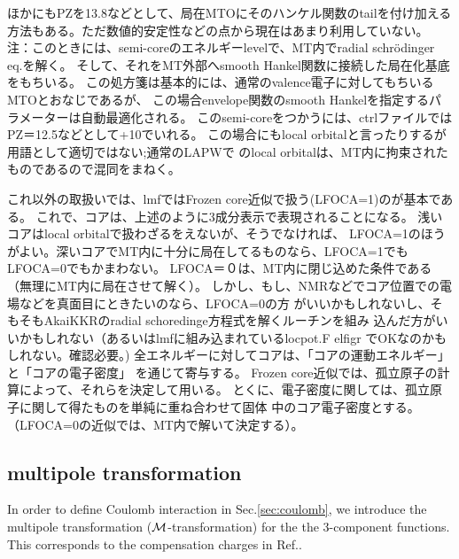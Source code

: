 \documentclass[a4paper,10pt,aip,onecolumn,amsmath,amssymb,floatfix,rmp]{revtex4-1}
\def\MM{{\cal M}}
\begin{document}
{\small 
ほかにもPZを13.8などとして、局在MTOにそのハンケル関数のtailを付け加える
方法もある。ただ数値的安定性などの点から現在はあまり利用していない。
注：このときには、semi-coreのエネルギーlevelで、MT内でradial schr\"odinger eq.を解く。
そして、それをMT外部へsmooth Hankel関数に接続した局在化基底をもちいる。
この処方箋は基本的には、通常のvalence電子に対してもちいるMTOとおなじであるが、
この場合envelope関数のsmooth Hankelを指定するパラメーターは自動最適化される。
このsemi-coreをつかうには、ctrlファイルではPZ＝12.5などとして+10でいれる。
この場合にもlocal orbitalと言ったりするが用語として適切ではない;通常のLAPWで
のlocal orbitalは、MT内に拘束されたものであるので混同をまねく。
}

これ以外の取扱いでは、lmfではFrozen core近似で扱う(LFOCA=1)のが基本である。
これで、コアは、上述のように3成分表示で表現されることになる。
浅いコアはlocal orbitalで扱わざるをえないが、そうでなければ、
LFOCA=1のほうがよい。深いコアでMT内に十分に局在してるものなら、LFOCA=1でもLFOCA=0でもかまわない。
LFOCA＝０は、MT内に閉じ込めた条件である（無理にMT内に局在させて解く）。
しかし、もし、NMRなどでコア位置での電場などを真面目にときたいのなら、LFOCA=0の方
がいいかもしれないし、そもそもAkaiKKRのradial schoredinge方程式を解くルーチンを組み
込んだ方がいいかもしれない（あるいはlmfに組み込まれているlocpot.F elfigr
でOKなのかもしれない。確認必要。)
全エネルギーに対してコアは、「コアの運動エネルギー」と「コアの電子密度」
を通じて寄与する。
Frozen core近似では、孤立原子の計算によって、それらを決定して用いる。
とくに、電子密度に関しては、孤立原子に関して得たものを単純に重ね合わせて固体
中のコア電子密度とする。（LFOCA=0の近似では、MT内で解いて決定する）。

\subsection{multipole transformation}
\label{sec:multi} In order to define Coulomb interaction in
Sec.\ref{sec:coulomb}, we introduce the multipole transformation
($\MM$-transformation) for the the 3-component functions.  This
corresponds to the compensation charges in Ref..
\end{document}
